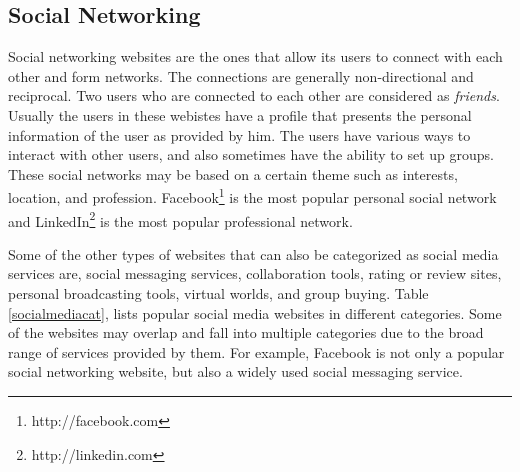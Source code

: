 \subsection{Social Networking}
Social networking websites are the ones that allow its users to connect with each other and form networks. The connections are generally non-directional and reciprocal. Two users who are connected to each other are considered as \textit{friends}. Usually the users in these webistes have a profile that presents the personal information of the user as provided by him. The users have various ways to interact with other users, and also sometimes have the ability to set up groups. These social networks may be based on a certain theme such as interests, location, and profession. Facebook\footnote{http://facebook.com} is the most popular personal social network and LinkedIn\footnote{http://linkedin.com} is the most popular professional network.

Some of the other types of websites that can also be categorized as social media services are, social messaging services, collaboration tools, rating or review sites, personal broadcasting tools, virtual worlds, and group buying. Table \ref{socialmediacat}, lists popular social media websites in different categories. Some of the websites may overlap and fall into multiple categories due to the broad range of services provided by them. For example, Facebook is not only a popular social networking website, but also a widely used social messaging service.

